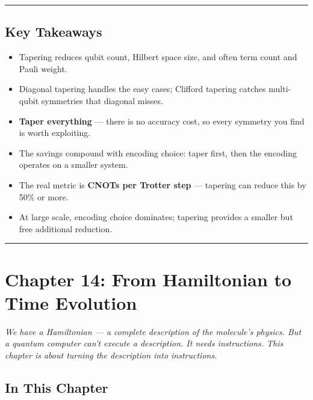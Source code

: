 \documentclass[
  11pt,
  oneside]{book}
\providecommand{\tightlist}{%
  \setlength{\itemsep}{0pt}\setlength{\parskip}{0pt}}
\begin{document}
\begin{center}\rule{0.5\linewidth}{0.5pt}\end{center}

\section{Key Takeaways}\label{key-takeaways-12}

\begin{itemize}
\tightlist
\item
  Tapering reduces qubit count, Hilbert space size, and often term count
  and Pauli weight.
\item
  Diagonal tapering handles the easy cases; Clifford tapering catches
  multi-qubit symmetries that diagonal misses.
\item
  \textbf{Taper everything} --- there is no accuracy cost, so every
  symmetry you find is worth exploiting.
\item
  The savings compound with encoding choice: taper first, then the
  encoding operates on a smaller system.
\item
  The real metric is \textbf{CNOTs per Trotter step} --- tapering can
  reduce this by 50\% or more.
\item
  At large scale, encoding choice dominates; tapering provides a smaller
  but free additional reduction.
\end{itemize}

\begin{center}\rule{0.5\linewidth}{0.5pt}\end{center}

\chapter{Chapter 14: From Hamiltonian to Time
Evolution}\label{chapter-14-from-hamiltonian-to-time-evolution}

\emph{We have a Hamiltonian --- a complete description of the molecule's
physics. But a quantum computer can't execute a description. It needs
instructions. This chapter is about turning the description into
instructions.}

\section{In This Chapter}\label{in-this-chapter-13}
\end{document}
